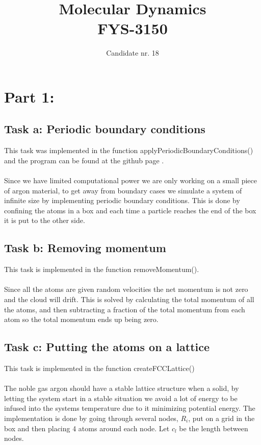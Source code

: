 \documentclass[11pt]{article}
\title{ Molecular Dynamics \\ FYS-3150 }
\author{Candidate nr. 18 }
\begin{document}
\maketitle

\tableofcontents

\section{Part 1:}

\subsection{Task a: Periodic boundary conditions}
	This task was implemented in the function applyPeriodicBoundaryConditions() and the program can be found at the github page \cite{myGit}.
\\ \\
	\noindent Since we have limited computational power we are only working on a small piece of argon material, to get away from boundary cases we simulate a system of infinite size by implementing periodic boundary conditions. This is done by confining the atoms in a box and each time a particle reaches the end of the box it is put to the other side.

\subsection{Task b: Removing momentum}
	This task is implemented in the function removeMomentum().
\\ \\
	\noindent Since all the atoms are given random velocities the net momentum is not zero and the cloud will drift. This is solved by calculating the total momentum of all the atoms, and then subtracting a fraction of the total momentum from each atom so the total momentum ends up being zero.

\subsection{Task c: Putting the atoms on a lattice}
	This task is implemented in the function createFCCLattice()
\\ \\
	\noindent The noble gas argon should have a stable lattice structure when a solid, by letting the system start in a stable situation we avoid a lot of energy to be infused into the systems temperature due to it minimizing potential energy. The implementation is done by going through several nodes, \(R_i\), put on a grid in the box and then placing 4 atoms around each node. Let \(c_l\) be the length between nodes.
\end{document}
